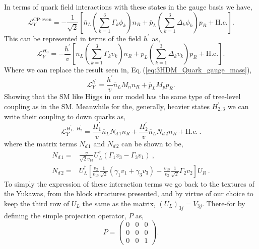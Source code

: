 \documentclass[10pt]{book}
\renewcommand{\(}{\left(}
\renewcommand{\)}{\right)}
\renewcommand{\[}{\left[}
\renewcommand{\]}{\right]}
\begin{document}
In terms of quark field interactions with these states in the gauge basis we have, 
%
\begin{equation}
\mathcal{L}_Y^{\text{CP-even}} = 
- \frac{1}{\sqrt{2}} \left[ \overline{n}_L \left( \sum_{k=1}^3 \Gamma_k \phi_k \right) n_R + \overline{p}_L \left( \sum_{k=1}^3 \Delta_k \phi_k \right) p_R  + \text{H.c.}  \right] . 
\end{equation}
This can be represented in terms of the field $h^\prime$ as, 
\begin{equation}
\mathcal{L}_Y^{H_0} =
- \frac{h^\prime}{v} \left[ \overline{n}_L \left( \sum_{k=1}^3 \Gamma_k v_k \right) n_R + \overline{p}_L \left( \sum_{k=1}^3 \Delta_k v_k \right) p_R + \text{H.c.} \right] .
\end{equation}
%
Where we can replace the result seen in, Eq.\,(\ref{eq:3HDM_Quark_gauge_mass}), 
%
\begin{equation}
\mathcal{L}_Y^{h^\prime} = \frac{h^\prime}{v} \overline{n}_L M_n n_R +  \overline{p}_L M_p p_R .  
\end{equation} 
Showing that the SM like Higgs in our model has the same type of tree-level coupling as in the SM. 
%
Meanwhile for the, generally, heavier states $H_{2,3}^\prime$ we can write their coupling to down quarks as, 
\begin{equation}
\mathcal{L}^{H_1^\prime \, , \, H_2^\prime}_Y = 
\frac{H_1^\prime}{v} \overline{n}_L N_{d\,1} n_R + 
\frac{H_2^\prime}{v} \overline{n}_L N_{d\,2} n_R + 
\text{H.c.} \ . 
\end{equation} 
% 
where the matrix terms $N_{d\,1}$ and $N_{d\,2}$ can be shown to be, 
\begin{equation}
\begin{split}
N_{d\,1} = & \frac{v}{\sqrt{2} v_{13}} U_L^\dagger \left( \Gamma_1 v_3 - \Gamma_3 v_1 \right) \ , \\ 
N_{d\,2} = & U_L^\dagger \left[ \frac{v_2}{v_{13}} \frac{1}{\sqrt{2}} \left( \gamma_1 v_1 + \gamma_3 v_3 \right) - \frac{v_{13}}{v_2} \frac{1}{\sqrt{2}} \Gamma_2 v_2  \right] U_R \ . 
\end{split} 
\end{equation}
To simply the expression of these interaction terms we go back to the textures of the Yukawas, from the block structures presented, and by virtue of our choice to keep the third row of $U_L$ the same as the  matrix, $(U_L)_{3j} = V_{3j}$. There-for by defining the simple projection operator, $P$ as, 
\begin{equation}
P = 
\begin{pmatrix}
0 & 0 & 0 \\ 
0 & 0 & 0 \\ 
0 & 0 & 1 
\end{pmatrix}. 
\end{equation}
\end{document}
